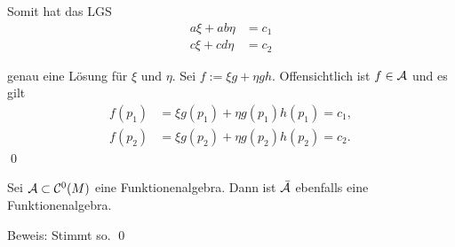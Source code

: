 \begin{frame}
    Somit hat das LGS 
    \begin{align*}
        a \xi + ab \eta &= c_1 \\
        c \xi + cd \eta &= c_2
    \end{align*}

    genau eine Lösung für \( \xi \) und \( \eta \). 
    \pause
    Sei \( f := \xi g + \eta g h \). Offensichtlich ist \( f \in \mathcal{A} \) und es gilt 
    \begin{align*}
        f(p_1) &= \xi g(p_1) + \eta g(p_1) h(p_1) = c_1, \\
        f(p_2) &= \xi g(p_2) + \eta g(p_2) h(p_2) = c_2.
    \end{align*}
    \qed
\end{frame}

\begin{frame}
    \begin{lem}
        Sei \( \mathcal{A} \subset \mathcal{C}^0(M) \) eine Funktionenalgebra. 
        Dann ist \( \bar{\mathcal{A}} \) ebenfalls eine Funktionenalgebra.
    \end{lem}
    Beweis: Stimmt so. \qed
\end{frame}